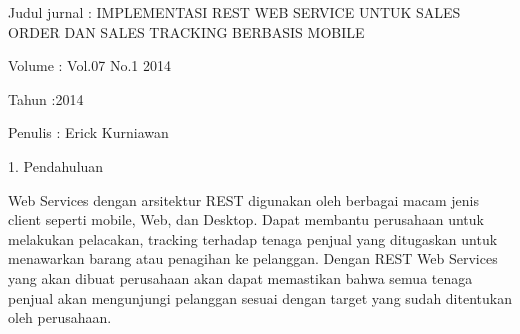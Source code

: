 \documentclass[12pt, times new roman, a4paper]{article}
\begin{document}
Judul jurnal	: IMPLEMENTASI REST WEB SERVICE UNTUK SALES ORDER DAN SALES TRACKING BERBASIS MOBILE	

Volume			: Vol.07 No.1 2014

Tahun			:2014

Penulis 		: Erick Kurniawan

1.	Pendahuluan


Web Services dengan arsitektur REST digunakan oleh berbagai macam jenis client seperti mobile, Web, dan Desktop. Dapat membantu perusahaan untuk melakukan pelacakan, tracking terhadap tenaga penjual yang ditugaskan untuk menawarkan barang atau penagihan ke pelanggan. Dengan REST Web Services yang akan dibuat perusahaan akan dapat memastikan bahwa semua tenaga penjual akan mengunjungi pelanggan sesuai dengan target yang sudah ditentukan oleh perusahaan.
\end{document}
